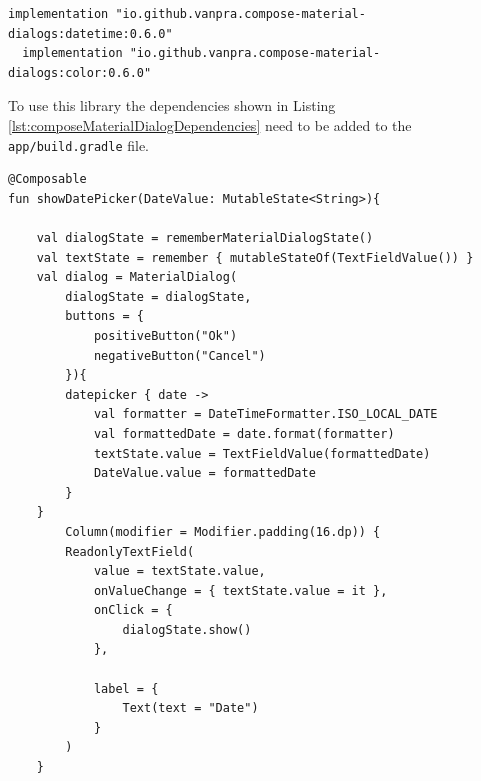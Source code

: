 \documentclass[12pt]{article}
\begin{document}
\begin{lstlisting}[numbers=none, 
			caption=Compose Material Dialogs Dependencies,
			label={lst:composeMaterialDialogDependencies}]
  implementation "io.github.vanpra.compose-material-dialogs:datetime:0.6.0"
  implementation "io.github.vanpra.compose-material-dialogs:color:0.6.0"

\end{lstlisting}
To use this library the dependencies shown in Listing \ref{lst:composeMaterialDialogDependencies} need to be added to the \verb|app/build.gradle| file. 

\begin{lstlisting}[numbers=none, 
			caption=DatePicker ,
			label={lst:datePicker}]
  @Composable
fun showDatePicker(DateValue: MutableState<String>){

    val dialogState = rememberMaterialDialogState()
    val textState = remember { mutableStateOf(TextFieldValue()) }
    val dialog = MaterialDialog(
        dialogState = dialogState,
        buttons = {
            positiveButton("Ok")
            negativeButton("Cancel")
        }){
        datepicker { date ->
            val formatter = DateTimeFormatter.ISO_LOCAL_DATE
            val formattedDate = date.format(formatter)
            textState.value = TextFieldValue(formattedDate)
            DateValue.value = formattedDate
        }
    }
        Column(modifier = Modifier.padding(16.dp)) {
        ReadonlyTextField(
            value = textState.value,
            onValueChange = { textState.value = it },
            onClick = {
                dialogState.show()
            },

            label = {
                Text(text = "Date")
            }
        )
    }
\end{lstlisting}
\end{document}
